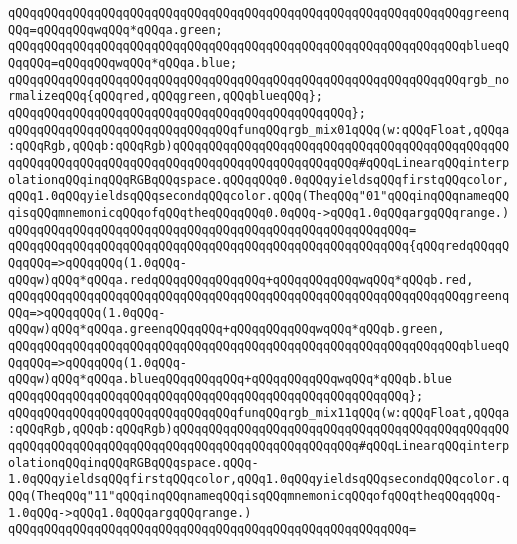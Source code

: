 \verb|qQQqqQQqqQQqqQQqqQQqqQQqqQQqqQQqqQQqqQQqqQQqqQQqqQQqqQQqqQQqqQQqgreenqQQq=qQQqqQQqwqQQq*qQQqa.green;|\newline
\verb|qQQqqQQqqQQqqQQqqQQqqQQqqQQqqQQqqQQqqQQqqQQqqQQqqQQqqQQqqQQqqQQqblueqQQqqQQq=qQQqqQQqwqQQq*qQQqa.blue;|\newline
\newline
\verb|qQQqqQQqqQQqqQQqqQQqqQQqqQQqqQQqqQQqqQQqqQQqqQQqqQQqqQQqqQQqqQQqrgb_normalizeqQQq{qQQqred,qQQqgreen,qQQqblueqQQq};|\newline
\verb|qQQqqQQqqQQqqQQqqQQqqQQqqQQqqQQqqQQqqQQqqQQqqQQq};|\newline
\newline
\verb|qQQqqQQqqQQqqQQqqQQqqQQqqQQqqQQqfunqQQqrgb_mix01qQQq(w:qQQqFloat,qQQqa:qQQqRgb,qQQqb:qQQqRgb)qQQqqQQqqQQqqQQqqQQqqQQqqQQqqQQqqQQqqQQqqQQqqQQqqQQqqQQqqQQqqQQqqQQqqQQqqQQqqQQqqQQqqQQqqQQqqQQq#qQQqLinearqQQqinterpolationqQQqinqQQqRGBqQQqspace.qQQqqQQq0.0qQQqyieldsqQQqfirstqQQqcolor,qQQq1.0qQQqyieldsqQQqsecondqQQqcolor.qQQq(TheqQQq"01"qQQqinqQQqnameqQQqisqQQqmnemonicqQQqofqQQqtheqQQqqQQq0.0qQQq->qQQq1.0qQQqargqQQqrange.)|\newline
\verb|qQQqqQQqqQQqqQQqqQQqqQQqqQQqqQQqqQQqqQQqqQQqqQQqqQQqqQQq=|\newline
\verb|qQQqqQQqqQQqqQQqqQQqqQQqqQQqqQQqqQQqqQQqqQQqqQQqqQQqqQQq{qQQqredqQQqqQQqqQQq=>qQQqqQQq(1.0qQQq-qQQqw)qQQq*qQQqa.redqQQqqQQqqQQqqQQq+qQQqqQQqqQQqwqQQq*qQQqb.red,|\newline
\verb|qQQqqQQqqQQqqQQqqQQqqQQqqQQqqQQqqQQqqQQqqQQqqQQqqQQqqQQqqQQqqQQqgreenqQQq=>qQQqqQQq(1.0qQQq-qQQqw)qQQq*qQQqa.greenqQQqqQQq+qQQqqQQqqQQqwqQQq*qQQqb.green,|\newline
\verb|qQQqqQQqqQQqqQQqqQQqqQQqqQQqqQQqqQQqqQQqqQQqqQQqqQQqqQQqqQQqqQQqblueqQQqqQQq=>qQQqqQQq(1.0qQQq-qQQqw)qQQq*qQQqa.blueqQQqqQQqqQQq+qQQqqQQqqQQqwqQQq*qQQqb.blue|\newline
\verb|qQQqqQQqqQQqqQQqqQQqqQQqqQQqqQQqqQQqqQQqqQQqqQQqqQQqqQQq};|\newline
\newline
\verb|qQQqqQQqqQQqqQQqqQQqqQQqqQQqqQQqfunqQQqrgb_mix11qQQq(w:qQQqFloat,qQQqa:qQQqRgb,qQQqb:qQQqRgb)qQQqqQQqqQQqqQQqqQQqqQQqqQQqqQQqqQQqqQQqqQQqqQQqqQQqqQQqqQQqqQQqqQQqqQQqqQQqqQQqqQQqqQQqqQQqqQQq#qQQqLinearqQQqinterpolationqQQqinqQQqRGBqQQqspace.qQQq-1.0qQQqyieldsqQQqfirstqQQqcolor,qQQq1.0qQQqyieldsqQQqsecondqQQqcolor.qQQq(TheqQQq"11"qQQqinqQQqnameqQQqisqQQqmnemonicqQQqofqQQqtheqQQqqQQq-1.0qQQq->qQQq1.0qQQqargqQQqrange.)|\newline
\verb|qQQqqQQqqQQqqQQqqQQqqQQqqQQqqQQqqQQqqQQqqQQqqQQqqQQqqQQq=|\newline
